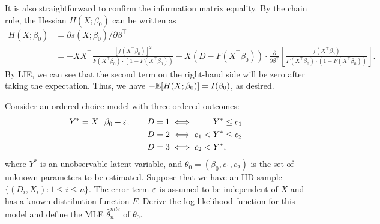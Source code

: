 \documentclass[11pt, A4paper, openany, uplatex]{book}
\begin{document}
It is also straightforward to confirm the information matrix equality.
By the chain rule, the Hessian $H(X; \beta_0)$ can be written as
\begin{align*}
	H(X; \beta_0) 
	& = \partial s(X; \beta_0)/ \partial \beta^\top \\
	& = - XX^\top \frac{[f(X^\top \beta_0)]^2}{F(X^\top \beta_0) \cdot (1 -  F(X^\top\beta_0)) } + X (D - F(X^\top \beta_0)) \cdot \frac{\partial}{\partial \beta^\top} \left[ \frac{f(X^\top \beta_0)}{F(X^\top \beta_0) \cdot (1 -  F(X^\top\beta_0)) }\right].
\end{align*}
By LIE, we can see that the second term on the right-hand side will be zero after taking the expectation.
Thus, we have $-\mathbb{E}[H(X; \beta_0) ] = I(\beta_0)$, as desired.

\hrulefill
\begin{exercise}\upshape
	Consider an ordered choice model with three ordered outcomes:
	\begin{align*}
	Y^* 
	= X^\top\beta_0 + \varepsilon, \qquad D = 1 \iff  \qquad\:  Y^* & \le c_1 \\
	D = 2  \iff c_1 < Y^* & \le c_2 \\
	D = 3  \iff c_2 < Y^* &,
	\end{align*}
	where $Y^*$ is an unobservable latent variable, and $\theta_0 = (\beta_0, c_1, c_2)$ is the set of unknown parameters to be estimated.
	Suppose that we have an IID sample $\{(D_i, X_i): 1 \le i \le n\}$.
	The error term $\varepsilon$ is assumed to be independent of $X$ and has a known distribution function $F$.
	Derive the log-likelihood function for this model and define the MLE $\hat \theta_n^{mle}$ of $\theta_0$.
\end{exercise}
\end{document}
